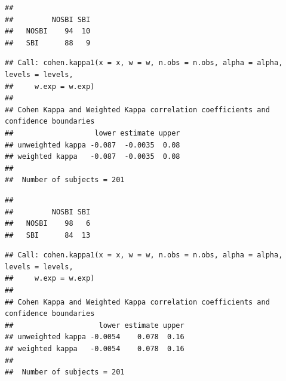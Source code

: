 \documentclass[
]{book}
\newenvironment{Shaded}{\begin{snugshade}}{\end{snugshade}}
\newcommand{\AttributeTok}[1]{\textcolor[rgb]{0.13,0.29,0.53}{#1}}
\newcommand{\CommentTok}[1]{\textcolor[rgb]{0.56,0.35,0.01}{\textit{#1}}}
\newcommand{\FunctionTok}[1]{\textcolor[rgb]{0.13,0.29,0.53}{\textbf{#1}}}
\newcommand{\NormalTok}[1]{#1}
\newcommand{\SpecialCharTok}[1]{\textcolor[rgb]{0.81,0.36,0.00}{\textbf{#1}}}
\newcommand{\StringTok}[1]{\textcolor[rgb]{0.31,0.60,0.02}{#1}}
\begin{document}
\begin{verbatim}
##        
##         NOSBI SBI
##   NOSBI    94  10
##   SBI      88   9
\end{verbatim}

\begin{Shaded}
\end{Shaded}

\begin{verbatim}
## Call: cohen.kappa1(x = x, w = w, n.obs = n.obs, alpha = alpha, levels = levels, 
##     w.exp = w.exp)
## 
## Cohen Kappa and Weighted Kappa correlation coefficients and confidence boundaries 
##                   lower estimate upper
## unweighted kappa -0.087  -0.0035  0.08
## weighted kappa   -0.087  -0.0035  0.08
## 
##  Number of subjects = 201
\end{verbatim}

\begin{Shaded}
\end{Shaded}

\begin{verbatim}
##        
##         NOSBI SBI
##   NOSBI    98   6
##   SBI      84  13
\end{verbatim}

\begin{Shaded}
\end{Shaded}

\begin{verbatim}
## Call: cohen.kappa1(x = x, w = w, n.obs = n.obs, alpha = alpha, levels = levels, 
##     w.exp = w.exp)
## 
## Cohen Kappa and Weighted Kappa correlation coefficients and confidence boundaries 
##                    lower estimate upper
## unweighted kappa -0.0054    0.078  0.16
## weighted kappa   -0.0054    0.078  0.16
## 
##  Number of subjects = 201
\end{verbatim}
\end{document}
